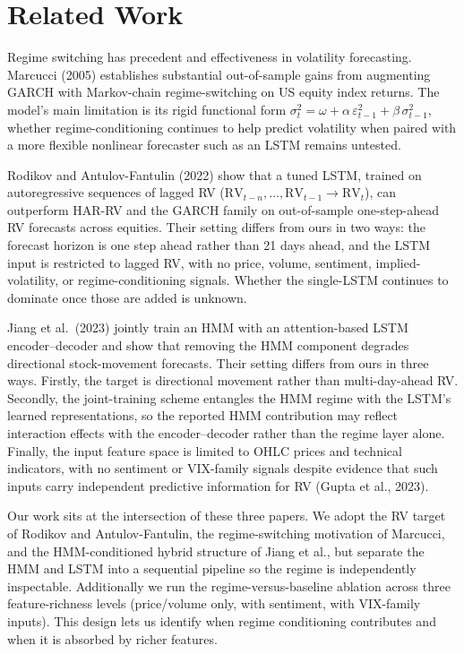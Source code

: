\documentclass{article}
\begin{document}
\section{Related Work}
      Regime switching has precedent and effectiveness in volatility forecasting. Marcucci (2005) establishes substantial out-of-sample gains from augmenting GARCH with Markov-chain regime-switching on US equity index returns. The model's main limitation is its rigid functional form $\sigma_t^2 = \omega + \alpha\,\varepsilon_{t-1}^2 + \beta\,\sigma_{t-1}^2$, whether regime-conditioning continues to help predict volatility when paired with a more flexible nonlinear forecaster such as an LSTM remains untested.
  
Rodikov and Antulov-Fantulin (2022) show that a tuned LSTM, trained on autoregressive sequences of lagged RV ($\mathrm{RV}_{t-n}, \dots, \mathrm{RV}_{t-1}
  \to \mathrm{RV}_t$), can outperform HAR-RV and the GARCH family on out-of-sample one-step-ahead RV forecasts across equities. Their setting differs from ours in two ways: the forecast horizon is one step ahead rather than 21 days ahead, and the LSTM
   input is restricted to lagged RV, with no price, volume, sentiment, implied-volatility, or regime-conditioning signals. Whether the single-LSTM
   continues to dominate once those are added is unknown.

Jiang et al.\ (2023) jointly train an HMM with an attention-based LSTM encoder--decoder and show that removing the HMM component degrades directional
  stock-movement forecasts. Their setting differs from ours in three ways. Firstly, the target is directional movement rather than multi-day-ahead RV. Secondly, the             
  joint-training scheme entangles the HMM regime with the LSTM's learned representations, so the reported HMM contribution may reflect interaction effects with the
  encoder--decoder rather than the regime layer alone. Finally, the input feature space is limited to OHLC prices and technical indicators, with no sentiment or VIX-family signals 
  despite evidence that such inputs carry independent predictive information for RV (Gupta et al., 2023).

Our work sits at the intersection of these three papers. We adopt the RV target of Rodikov and Antulov-Fantulin, the regime-switching motivation of        
  Marcucci, and the HMM-conditioned hybrid structure of Jiang et al., but separate the HMM and LSTM into a sequential pipeline so the regime is independently inspectable. Additionally 
  we run the regime-versus-baseline ablation across three feature-richness levels (price/volume only, with sentiment, with VIX-family inputs). This design lets us identify    
  when regime conditioning contributes and when it is absorbed by richer features.
\end{document}

